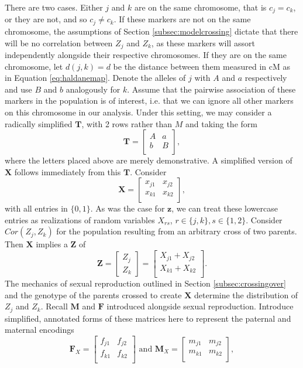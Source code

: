 \documentclass[sts]{imsart}
\newcommand{\ve}[1]{\mathbf{#1}}           %
\newcommand{\m}[1]{\mathbf{#1}}               %
\begin{document}
There are two cases. Either $j$ and $k$ are on the same chromosome, that is $c_j = c_k$, or they are not, and so $c_j \neq c_k$. If these markers are not on the same chromosome, the assumptions of Section \ref{subsec:modelcrossing} dictate that there will be no correlation between $Z_j$ and $Z_k$, as these markers will assort independently alongside their respective chromosomes. If they are on the same chromosome, let $d(j,k) = d$ be the distance between them measured in cM as in Equation \ref{eq:haldanemap}. Denote the alleles of $j$ with $A$ and $a$ respectively and use $B$ and $b$ analogously for $k$. Assume that the pairwise association of these markers in the population is of interest, i.e. that we can ignore all other markers on this chromosome in our analysis. Under this setting, we may consider a radically simplified $\m{T}$, with 2 rows rather than $M$ and taking the form
$$\m{T} = \begin{bmatrix}
  A & a \\
  b & B \\
\end{bmatrix},$$
where the letters placed above are merely demonstrative. A simplified version of $\m{X}$ follows immediately from this $\m{T}$. Consider
$$\m{X} = \begin{bmatrix}
  x_{j1} & x_{j2} \\
  x_{k1} & x_{k2} \\
\end{bmatrix},$$
with all entries in $\{0,1\}$. As was the case for $\ve{z}$, we can treat these lowercase entries as realizations of random variables $X_{rs}$, $r \in \{j,k\}, s \in \{1,2\}$. Consider $Cor(Z_j, Z_k)$ for the population resulting from an arbitrary cross of two parents. Then $\m{X}$ implies a $\ve{Z}$ of
$$\ve{Z} = \begin{bmatrix} Z_j \\ Z_k \end{bmatrix} = \begin{bmatrix}
  X_{j1} + X_{j2} \\
  X_{k1} + X_{k2} \\
\end{bmatrix}.$$
The mechanics of sexual reproduction outlined in Section \ref{subsec:crossingover} and the genotype of the parents crossed to create $\m{X}$ determine the distribution of $Z_j$ and $Z_k$. Recall $\m{M}$ and $\m{F}$ introduced alongside sexual reproduction. Introduce simplified, annotated forms of these matrices here to represent the paternal and maternal encodings
\begin{equation} \label{eq:parEncs}
  \m{F}_X = \begin{bmatrix}
  f_{j1} & f_{j2} \\
  f_{k1} & f_{k2} \\
\end{bmatrix} \text{ and }
\m{M}_X = \begin{bmatrix}
  m_{j1} & m_{j2} \\
  m_{k1} & m_{k2} \\
\end{bmatrix},
\end{equation}
\end{document}
